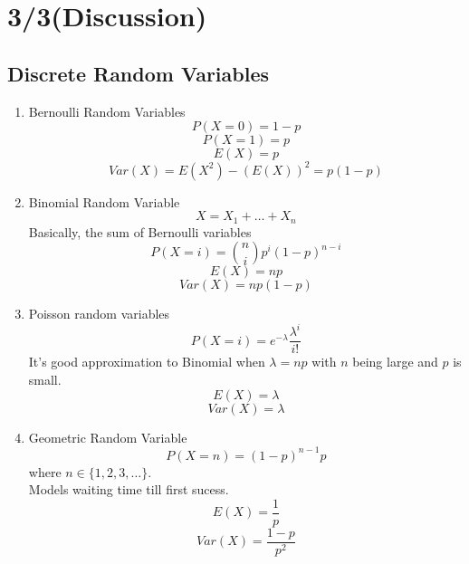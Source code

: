 \section*{3/3(Discussion)}
  \subsection*{Discrete Random Variables}
  \begin{enumerate}
    \item Bernoulli Random Variables
    $$
      P(X= 0) = 1 - p
    $$
    $$
      P(X = 1) = p
    $$
    $$
      E(X) = p
    $$
    $$
      Var(X) = E(X^2) - (E(X))^2 = p(1-p)
    $$
    \item Binomial Random Variable
    $$
      X = X_1 + \ldots + X_n
    $$
    Basically, the sum of Bernoulli variables
    $$
      P(X = i) = \binom{n}{i} p^i(1-p)^{n-i}
    $$
    $$
      E(X) = np
    $$
    $$
      Var(X) = np(1 - p)
    $$
    \item Poisson random variables
    $$
      P(X = i) = e^{-\lambda}\frac{\lambda^i}{i!}
    $$
    It's good approximation to Binomial when $\lambda = np$ with $n$ being
    large and $p$ is small.
    $$
      E(X) = \lambda
    $$
    $$
      Var(X) = \lambda
    $$
    \item Geometric Random Variable
    $$
      P(X = n) = (1-p)^{n-1}p
    $$
    where $n \in \{1, 2, 3, \ldots \}$.\\
    Models waiting time till first sucess.
    $$
      E(X) = \frac{1}{p}
    $$
    $$
      Var(X) = \frac{1-p}{p^2}
    $$
  \end{enumerate}

